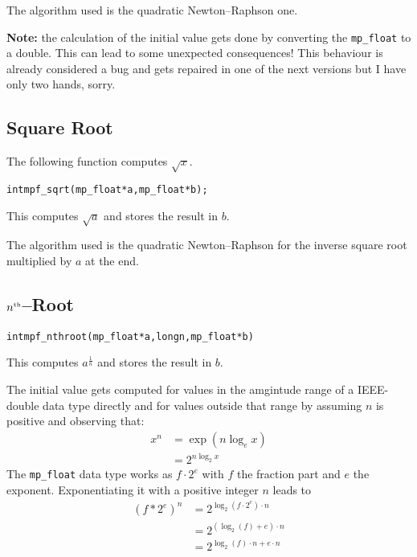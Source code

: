 \documentclass[a4paper]{book}
\theoremstyle{definition}
\theoremstyle{remark}
\begin{document}
The algorithm used is the quadratic Newton--Raphson one.

{\textbf{Note:}} the calculation of the initial value gets done by converting the {\texttt{mp\_float}} to a double. This can lead to some unexpected consequences! This behaviour is already considered a bug and gets repaired in one of the next versions but I have only two hands, sorry.

\subsection{Square Root}

The following function computes $\sqrt{x}$.

\begin{alltt}
int  mpf_sqrt(mp_float *a, mp_float *b);
\end{alltt}

This computes $\sqrt{a}$ and stores the result in $b$.

The algorithm used is the quadratic Newton--Raphson for the inverse square root multiplied by $a$ at the end.

\subsection{$n^{\text{\tiny th}}$--Root}
\begin{alltt}
int  mpf_nthroot(mp_float * a, long n, mp_float * b)
\end{alltt}

This computes $a^\frac{1}{n}$ and stores the result in $b$.

The initial value gets computed for values in the amgintude range of a IEEE-double data type directly and for values outside that range by assuming $n$ is positive and observing that:
\begin{equation}
\begin{split}
x^n& = \exp\left(n\log_e x\right)\\
   & = 2^{n\log_2 x}
\end{split}
\end{equation}
The {\texttt{mp\_float}} data type works as $f\cdot2^e$ with $f$ the fraction part and $e$ the exponent. Exponentiating it with a positive integer $n$ leads to
\begin{equation}
\begin{split}
(f * 2^e)^n& = 2^{\log_2(f \cdot 2^e) \cdot n}\\
           & = 2^{ (\log_2(f) + e)  \cdot n}\\
           & = 2^{ \log_2(f) \cdot n + e \cdot n}
\end{split}
\end{equation}
\end{document}
